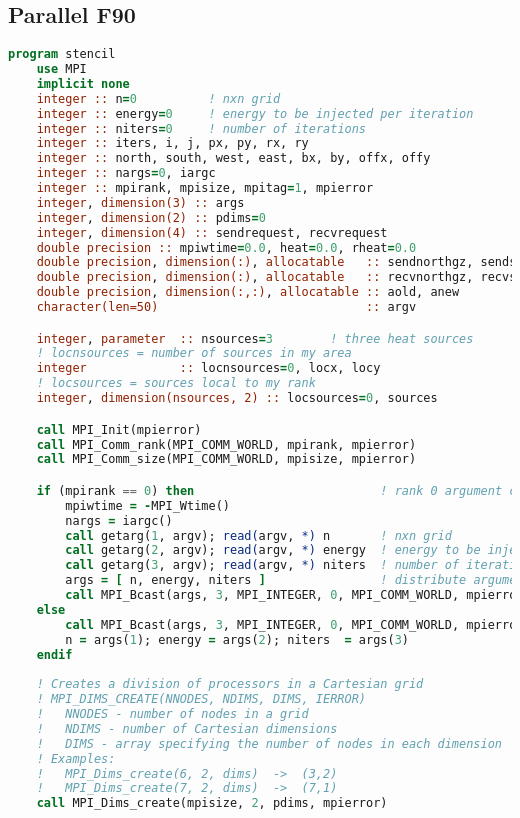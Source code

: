 \subsection{Parallel F90}
\begin{lstlisting}[language=Fortran, caption={Parallel F90 implementation of the stencil test case.}]
program stencil
    use MPI
    implicit none
    integer :: n=0          ! nxn grid
    integer :: energy=0     ! energy to be injected per iteration
    integer :: niters=0     ! number of iterations
    integer :: iters, i, j, px, py, rx, ry
    integer :: north, south, west, east, bx, by, offx, offy
    integer :: nargs=0, iargc
    integer :: mpirank, mpisize, mpitag=1, mpierror
    integer, dimension(3) :: args
    integer, dimension(2) :: pdims=0
    integer, dimension(4) :: sendrequest, recvrequest
    double precision :: mpiwtime=0.0, heat=0.0, rheat=0.0
    double precision, dimension(:), allocatable   :: sendnorthgz, sendsouthgz
    double precision, dimension(:), allocatable   :: recvnorthgz, recvsouthgz
    double precision, dimension(:,:), allocatable :: aold, anew
    character(len=50)                             :: argv

    integer, parameter  :: nsources=3        ! three heat sources
    ! locnsources = number of sources in my area
    integer             :: locnsources=0, locx, locy
    ! locsources = sources local to my rank
    integer, dimension(nsources, 2) :: locsources=0, sources

    call MPI_Init(mpierror)
    call MPI_Comm_rank(MPI_COMM_WORLD, mpirank, mpierror)
    call MPI_Comm_size(MPI_COMM_WORLD, mpisize, mpierror)

    if (mpirank == 0) then                          ! rank 0 argument checking
        mpiwtime = -MPI_Wtime()
        nargs = iargc()
        call getarg(1, argv); read(argv, *) n       ! nxn grid
        call getarg(2, argv); read(argv, *) energy  ! energy to be injected
        call getarg(3, argv); read(argv, *) niters  ! number of iterations
        args = [ n, energy, niters ]                ! distribute arguments
        call MPI_Bcast(args, 3, MPI_INTEGER, 0, MPI_COMM_WORLD, mpierror)
    else
        call MPI_Bcast(args, 3, MPI_INTEGER, 0, MPI_COMM_WORLD, mpierror)
        n = args(1); energy = args(2); niters  = args(3)
    endif
    
    ! Creates a division of processors in a Cartesian grid
    ! MPI_DIMS_CREATE(NNODES, NDIMS, DIMS, IERROR)
    !   NNODES - number of nodes in a grid
    !   NDIMS - number of Cartesian dimensions 
    !   DIMS - array specifying the number of nodes in each dimension
    ! Examples:
    !   MPI_Dims_create(6, 2, dims)  ->  (3,2)
    !   MPI_Dims_create(7, 2, dims)  ->  (7,1)
    call MPI_Dims_create(mpisize, 2, pdims, mpierror)


\end{lstlisting}
